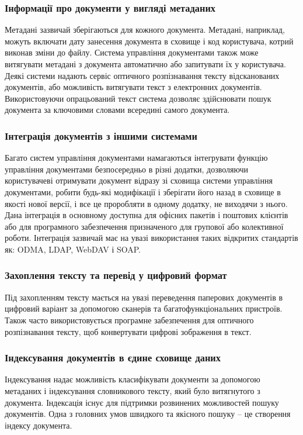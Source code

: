 \subsubsection{Інформації про документи у вигляді метаданих}
Метадані зазвичай зберігаються для кожного документа. 
Метадані, наприклад, можуть включати дату занесення документа в сховище і код користувача, котрий виконав зміни до файлу. 
Система управління документами також може витягувати метадані з документа автоматично або запитувати їх у користувача. 
Деякі системи надають сервіс оптичного розпізнавання тексту відсканованих документів, або можливість витягувати текст з електронних документів. 
Використовуючи опрацьований текст система дозволяє здійснювати пошук документа за ключовими словами всередині самого документа.

\subsubsection{Інтеграція документів з іншими системами}
Багато систем управління документами намагаються інтегрувати функцію управління документами безпосередньо в різні додатки, дозволяючи користувачеві отримувати документ відразу зі сховища системи управління документами, робити будь-які модифікації і зберігати його назад в сховище в якості нової версії, і все це проробляти в одному додатку, не виходячи з нього. 
Дана інтеграція в основному доступна для офісних пакетів і поштових клієнтів або для програмного забезпечення призначеного для групової або колективної роботи. 
Інтеграція зазвичай має на увазі використання таких відкритих стандартів як: ODMA, LDAP, WebDAV і SOAP.

\subsubsection{Захоплення тексту та перевід у цифровий формат}
Під захопленням тексту мається на увазі переведення паперових документів в цифровий варіант за допомогою сканерів та багатофункціональних пристроїв.
Також часто використовується програмне забезпечення для оптичного розпізнавання тексту, щоб конвертувати цифрові зображення в текст.

\subsubsection{Індексування документів в єдине сховище даних}
Індексування надає можливість класифікувати документи за допомогою метаданих і індексування словникового тексту, який було витягнутого з документа.
Індексація існує для підтримки розвинених можливостей пошуку документів. 
Одна з головних умов швидкого та якісного пошуку -- це створення індексу документа.

